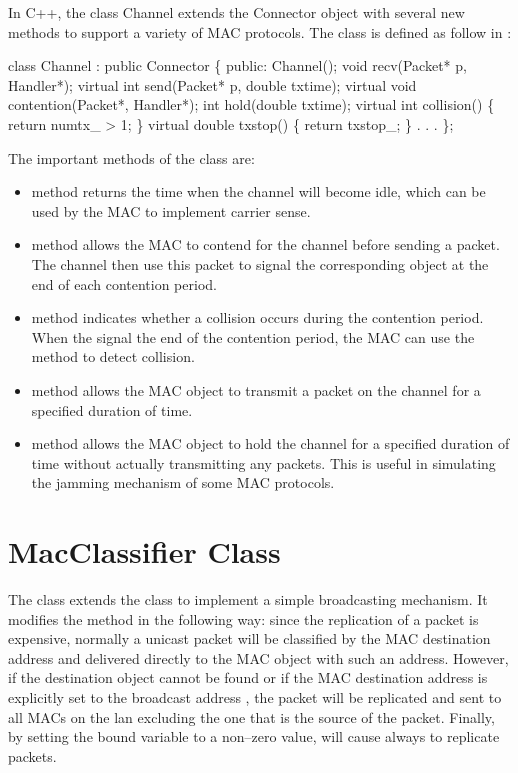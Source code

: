In C++, the class Channel extends the Connector object
with several new methods to
support a variety of MAC protocols.  The class is defined as follow in
:

\begin{program}
   class Channel : public Connector \{
   public:
        Channel();
        void recv(Packet* p, Handler*);
        virtual int send(Packet* p, double txtime);
        virtual void contention(Packet*, Handler*);
        int hold(double txtime);
        virtual int collision() \{ return numtx_ > 1; \}
        virtual double txstop() \{ return txstop_; \}
                . . .
   \};
\end{program}

The important methods of the class  are:

\begin{itemize}
\item  {} method returns the time when the channel will become
idle, which can be used by the MAC to implement carrier sense.
\item  {} method allows the MAC to contend for the channel
before sending a packet.  The channel then use this packet to signal the
corresponding  object at the end of each contention period.
\item  {} method indicates whether a collision occurs
during the contention period.  When the  signal the end of
the contention period, the MAC can use the  method to
detect collision.
\item  {} method allows the MAC object to transmit a packet on the
channel for a specified duration of time.
\item  {} method allows the MAC object to hold the channel for a
specified duration of time without actually transmitting any packets.
This is useful in simulating the jamming mechanism of some MAC
protocols.
\end{itemize}

\section{MacClassifier Class}
\label{sec:mac_classifier}

The  class extends the  class to
implement a simple broadcasting mechanism.  It modifies the
 method in the following way: since the replication of a
packet is expensive, normally a unicast packet will be classified by
the MAC destination address  and delivered directly to
the MAC object with such an address.  However, if the destination
object cannot be found or if the MAC destination address is explicitly
set to the broadcast address , the packet will be
replicated and sent to all MACs on the lan excluding the one that is
the source of the packet.  Finally, by setting the bound variable
 to a non--zero value, will cause
 always to replicate packets.

